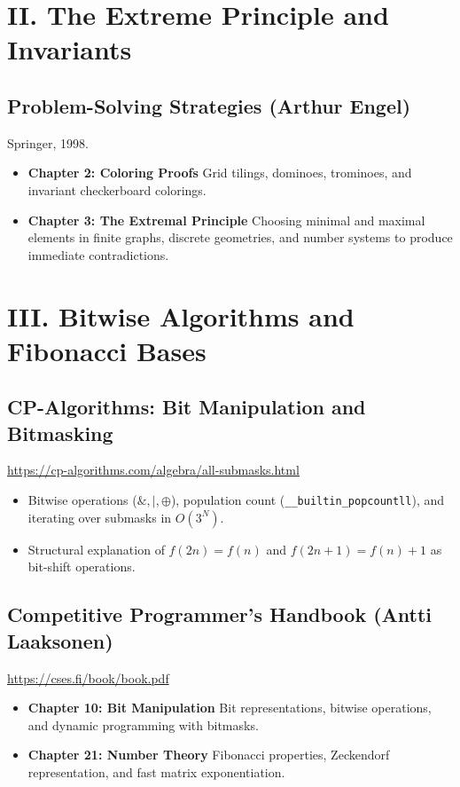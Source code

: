 \documentclass[11pt]{article}
\begin{document}
\section*{II. The Extreme Principle and Invariants}

\subsection*{Problem-Solving Strategies (Arthur Engel)}
Springer, 1998.

\begin{itemize}
    \item \textbf{Chapter 2: Coloring Proofs} Grid tilings, dominoes, trominoes, and invariant checkerboard colorings.
    \item \textbf{Chapter 3: The Extremal Principle} Choosing minimal and maximal elements in finite graphs, discrete geometries, and number systems to produce immediate contradictions.
\end{itemize}

\section*{III. Bitwise Algorithms and Fibonacci Bases}

\subsection*{CP-Algorithms: Bit Manipulation and Bitmasking}
\url{https://cp-algorithms.com/algebra/all-submasks.html}

\begin{itemize}
    \item Bitwise operations ($\&, |, \oplus$), population count (\texttt{\_\_builtin\_popcountll}), and iterating over submasks in $O(3^N)$.
    \item Structural explanation of $f(2n) = f(n)$ and $f(2n+1) = f(n)+1$ as bit-shift operations.
\end{itemize}

\subsection*{Competitive Programmer's Handbook (Antti Laaksonen)}
\url{https://cses.fi/book/book.pdf}

\begin{itemize}
    \item \textbf{Chapter 10: Bit Manipulation} Bit representations, bitwise operations, and dynamic programming with bitmasks.
    \item \textbf{Chapter 21: Number Theory} Fibonacci properties, Zeckendorf representation, and fast matrix exponentiation.
\end{itemize}
\end{document}
